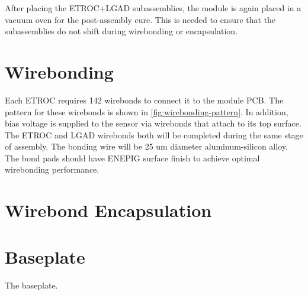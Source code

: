 \documentclass[10pt]{datasheet}
\begin{document}
After placing the ETROC+LGAD subassemblies, the module is again placed in a vacuum oven for the post-assembly cure. This is needed to ensure that the subassemblies do not shift during wirebonding or encapsulation.


\section{Wirebonding}

Each ETROC requires 142 wirebonds to connect it to the module PCB. The pattern for these wirebonds is shown in \ref{fig:wirebonding-pattern}. In addition, bias voltage is supplied to the sensor via wirebonds that attach to its top surface. The ETROC and LGAD wirebonds both will be completed during the same stage of assembly. The bonding wire will be 25 um diameter aluminum-silicon alloy. The bond pads should have ENEPIG surface finish to achieve optimal wirebonding performance.

\section{Wirebond Encapsulation}


\section{Baseplate}

The baseplate.




\begin{versionhistory}
\end{versionhistory}
\end{document}

